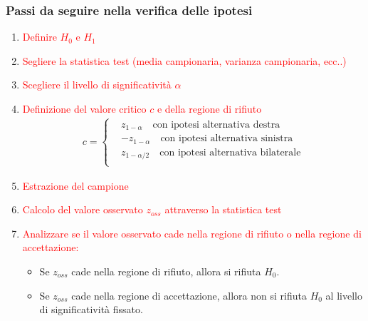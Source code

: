 \documentclass{article}  %
\theoremstyle{definition}
\begin{document}
\subsubsection{Passi da seguire nella verifica delle ipotesi}
\begin{enumerate}
	\item \textcolor{red}{Definire $H_0$ e $H_1$}
	\item \textcolor{red}{Segliere la statistica test (media campionaria, varianza campionaria, ecc..)}
	\item \textcolor{red}{Scegliere il livello di significatività $\alpha$}
	\item \textcolor{red}{Definizione del valore critico $c$ e della regione di rifiuto}
	      \begin{align*}
		      c = \begin{cases}
			           & z_{1-\alpha} \quad \text{con ipotesi alternativa destra}       \\
			           & -z_{1-\alpha} \quad \text{con ipotesi alternativa sinistra}    \\
			           & z_{1-\alpha/2} \quad \text{con ipotesi alternativa bilaterale} \\
		          \end{cases}
	      \end{align*}
	\item \textcolor{red}{Estrazione del campione}
	\item \textcolor{red}{Calcolo del valore osservato $z_{oss}$ attraverso la statistica test}
	\item \textcolor{red}{Analizzare se il valore osservato cade nella regione di rifiuto o nella regione di accettazione:}
	      \begin{itemize}
		      \item Se $z_{oss}$ cade nella regione di rifiuto, allora si rifiuta $H_0$.
		      \item Se $z_{oss}$ cade nella regione di accettazione, allora non si rifiuta $H_0$ al livello di significatività fissato.
	      \end{itemize}
\end{enumerate}
\end{document}
